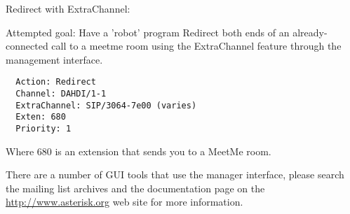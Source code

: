 Redirect with ExtraChannel:

  Attempted goal:
  Have a 'robot' program Redirect both ends of an already-connected call
  to a meetme room using the ExtraChannel feature through the management interface.

\begin{verbatim}
  Action: Redirect
  Channel: DAHDI/1-1
  ExtraChannel: SIP/3064-7e00 (varies)
  Exten: 680
  Priority: 1
\end{verbatim}

Where 680 is an extension that sends you to a MeetMe room.

There are a number of GUI tools that use the manager interface, please search
the mailing list archives and the documentation page on the
\url{http://www.asterisk.org} web site for more information.


